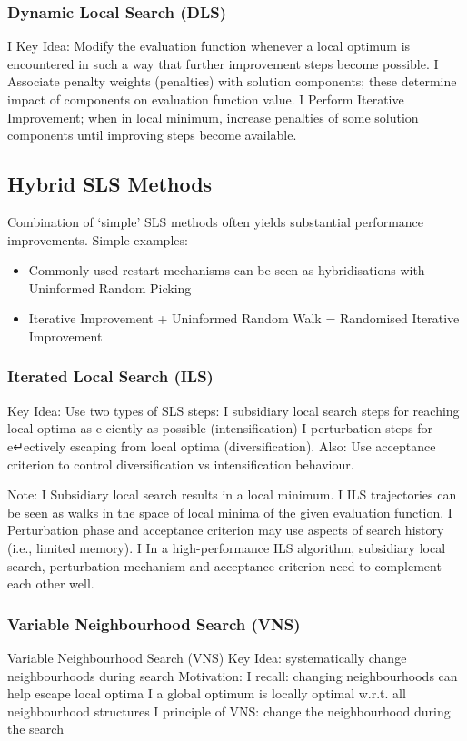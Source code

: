 \documentclass[a4paper,10pt]{article}
\begin{document}
\subsubsection{Dynamic Local Search (DLS)}
I Key Idea: Modify the evaluation function whenever a local optimum is encountered in such a way that further improvement steps become possible.
I Associate penalty weights (penalties) with solution components; these determine impact of components on evaluation function value.
I Perform Iterative Improvement; when in local minimum, increase penalties of some solution components
until improving steps become available.

	\subsection{Hybrid SLS Methods}
Combination of ‘simple’ SLS methods often yields substantial performance improvements. Simple examples:
\begin{itemize}
	\item Commonly used restart mechanisms can be seen as hybridisations with Uninformed Random Picking
	\item Iterative Improvement + Uninformed Random Walk = Randomised Iterative Improvement
\end{itemize} 


	\subsubsection{Iterated Local Search (ILS)}
Key Idea: Use two types of SLS steps:
I subsidiary local search steps for reaching
local optima as e ciently as possible (intensification)
I perturbation steps for e↵ectively
escaping from local optima (diversification).
Also: Use acceptance criterion to control diversification vs intensification behaviour.

Note:
I Subsidiary local search results in a local minimum. I ILS trajectories can be seen as walks in the space of
local minima of the given evaluation function.
I Perturbation phase and acceptance criterion may use aspects
of search history (i.e., limited memory).
I In a high-performance ILS algorithm, subsidiary local search, perturbation mechanism and acceptance criterion need to complement each other well.


		\subsubsection{Variable Neighbourhood Search (VNS)}
		Variable Neighbourhood Search (VNS)
Key Idea: systematically change neighbourhoods during search
Motivation:
I recall: changing neighbourhoods can help escape local optima I a global optimum is locally optimal w.r.t. all neighbourhood
structures
I principle of VNS: change the neighbourhood during the search
\end{document}
